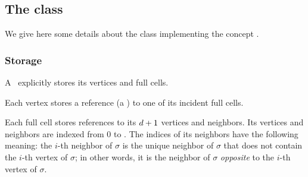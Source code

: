 
\subsection{The class \label{triangulation:tds:impl}}

We give here some details about the class
implementing the concept .


\subsubsection{Storage}

A \tds\ explicitly stores its vertices and full cells.

Each vertex stores a reference (a ) to one of its incident
full cells.


Each full cell stores references to its $d+1$ vertices and
neighbors. Its vertices and neighbors are indexed from $0$ to \cd. The indices
of its neighbors have the following meaning: the $i$-th neighbor of $\sigma$
is the unique neighbor of $\sigma$ that does not contain the $i$-th vertex of
$\sigma$; in other words, it is the neighbor of $\sigma$ {\em opposite} to
the $i$-th vertex of $\sigma$.

